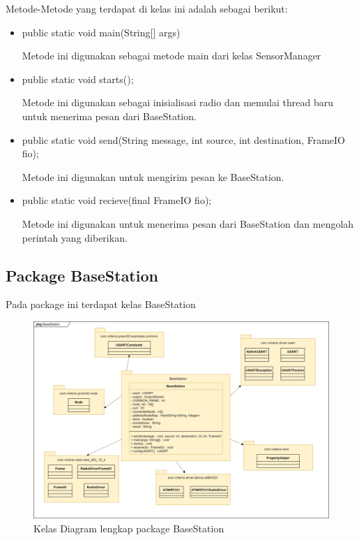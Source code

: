 Metode-Metode yang terdapat di kelas ini adalah sebagai berikut:
\begin{itemize}
    \item public static void main(String[] args)
    
    Metode ini digunakan sebagai metode main dari kelas SensorManager
    
    \item public static void starts();
    
    Metode ini digunakan sebagai inisialisasi radio dan memulai thread baru untuk menerima pesan dari BaseStation.
    
    \item public static void send(String message, int source, int destination, FrameIO fio);
    
    Metode ini digunakan untuk mengirim pesan ke BaseStation.
    
    \item public static void recieve(final FrameIO fio);
    
    Metode ini digunakan untuk menerima pesan dari BaseStation dan mengolah perintah yang diberikan.
\end{itemize}

\subsection{Package BaseStation}
Pada package ini terdapat kelas BaseStation

\begin{figure}[H] 
	\centering  
	\includegraphics[scale=0.2]{Gambar/class_baseStation.jpg}
	\caption[Kelas Diagram lengkap package BaseStation]{Kelas Diagram lengkap package BaseStation}
	\label{fig:class_baseStation} 
\end{figure}


